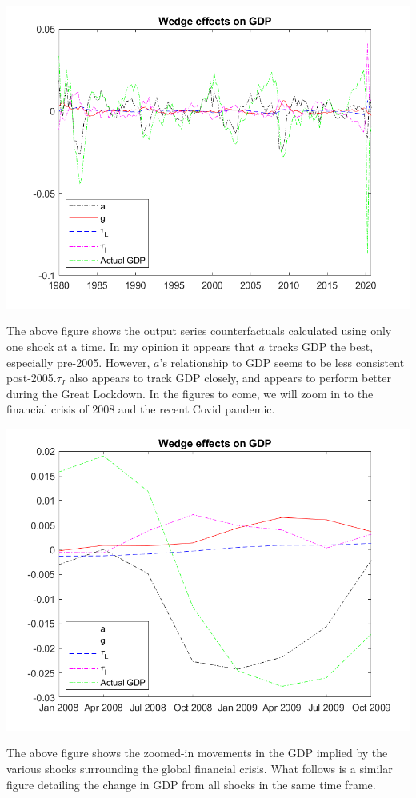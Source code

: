 \documentclass[11pt]{article} %
\begin{document}
\includegraphics{wedgesg}

The above figure shows the output series counterfactuals calculated using only one shock at a time. In my opinion it appears that $a$ tracks GDP the best, especially pre-2005. However, $a$'s relationship to GDP seems to be less consistent post-2005.$\tau_{I}$ also appears to track GDP closely, and appears to perform better during the Great Lockdown. In the figures to come, we will zoom in to the financial crisis of 2008 and the recent Covid pandemic.

\includegraphics{wedgesfin}

The above figure shows the zoomed-in movements in the GDP implied by the various shocks surrounding the global financial crisis. What follows is a similar figure detailing the change in GDP from all shocks in the same time frame.
\end{document}
